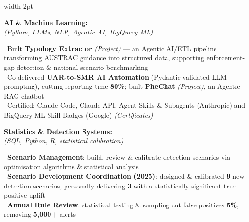 \documentclass[11pt,a4paper]{article}
\newcommand{\linesection}[1]{%
  \vspace{10pt}%
  \noindent{\color{headerblue}\large\bfseries #1}\hspace{0.5em}{\color{sectionline}\leavevmode\leaders\hrule height 1.5pt\hfill\kern0pt}%
  \par\vspace{8pt}%
}
\begin{document}
\vspace{6pt}

\linesection{KEY SKILLS}

\noindent\begin{minipage}{\textwidth}
\hspace{2pt}\vrule width 2pt\hspace{15pt}%
\begin{minipage}[t]{\textwidth-19pt}

\noindent\begin{minipage}[t]{0.28\textwidth}
\textbf{\color{headerblue}AI \& Machine Learning:}\\[0pt]
\textit{(Python, LLMs, NLP, Agentic AI, BigQuery ML)}
\end{minipage}%
\hfill%
\begin{minipage}[t]{0.68\textwidth}
\textbullet\ Built \textbf{Typology Extractor} \textit{(Project)} — an Agentic AI/ETL pipeline transforming AUSTRAC guidance into structured data, supporting enforcement-gap detection \& national scenario benchmarking\\
\textbullet\ Co-delivered \textbf{UAR-to-SMR AI Automation} (Pydantic-validated LLM prompting), cutting reporting time \textbf{80\%}; built \textbf{PheChat} \textit{(Project)}, an Agentic RAG chatbot\\
\textbullet\ Certified: Claude Code, Claude API, Agent Skills \& Subagents (Anthropic) and BigQuery ML Skill Badges (Google) \textit{(Certificates)}
\end{minipage}

\vspace{6pt}

\noindent\begin{minipage}[t]{0.28\textwidth}
\textbf{\color{headerblue}Statistics \& Detection Systems:}\\[0pt]
\textit{(SQL, Python, R, statistical calibration)}
\end{minipage}%
\hfill%
\begin{minipage}[t]{0.68\textwidth}
\textbullet\ \textbf{Scenario Management}: build, review \& calibrate detection scenarios via optimisation algorithms \& statistical analysis\\
\textbullet\ \textbf{Scenario Development Coordination (2025)}: designed \& calibrated \textbf{9} new detection scenarios, personally delivering \textbf{3} with a statistically significant true positive uplift\\
\textbullet\ \textbf{Annual Rule Review}: statistical testing \& sampling cut false positives \textbf{5\%}, removing \textbf{5,000+} alerts
\end{minipage}


\end{minipage}
\end{minipage}
\end{document}
